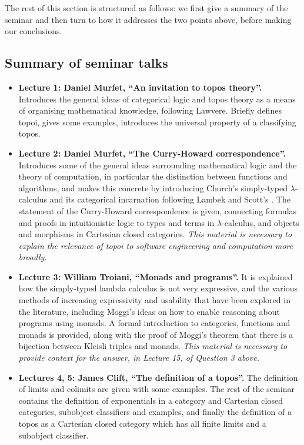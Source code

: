 \documentclass[english,letter paper,12pt,reqno]{article}
\theoremstyle{example}
\begin{document}
The rest of this section is structured as follows: we first give a summary of the seminar and then turn to how it addresses the two points above, before making our conclusions.

\subsection{Summary of seminar talks}

\begin{itemize}
\item \textbf{Lecture 1: Daniel Murfet, ``An invitation to topos theory''.} Introduces the general ideas of categorical logic and topos theory as a means of organising mathematical knowledge, following Lawvere. Briefly defines topoi, gives some examples, introduces the universal property of a classifying topos.

\item \textbf{Lecture 2: Daniel Murfet, ``The Curry-Howard correspondence''.} Introduces some of the general ideas surrounding mathematical logic and the theory of computation, in particular the distinction between functions and algorithms, and makes this concrete by introducing Church's simply-typed $\lambda$-calculus and its categorical incarnation following Lambek and Scott's \cite{lambekscott}. The statement of the Curry-Howard correspondence is given, connecting formulas and proofs in intuitionistic logic to types and terms in $\lambda$-calculus, and objects and morphisms in Cartesian closed categories. \emph{This material is necessary to explain the relevance of topoi to software engineering and computation more broadly.}

\item \textbf{Lecture 3: William Troiani, ``Monads and programs''.} It is explained how the simply-typed lambda calculus is not very expressive, and the various methods of increasing expressivity and usability that have been explored in the literature, including Moggi's ideas on how to enable reasoning about programs using monads. A formal introduction to categories, functions and monads is provided, along with the proof of Moggi's theorem that there is a bijection between Kleisli triples and monads. \emph{This material is necessary to provide context for the answer, in Lecture 15, of Question 3 above.}

\item \textbf{Lectures 4, 5: James Clift, ``The definition of a topos''.} The definition of limits and colimits are given with some examples. The rest of the seminar contains the definition of exponentials in a category and Cartesian closed categories, subobject classifiers and examples, and finally the definition of a topos as a Cartesian closed category which has all finite limits and a subobject classifier.


\end{itemize}
\end{document}
